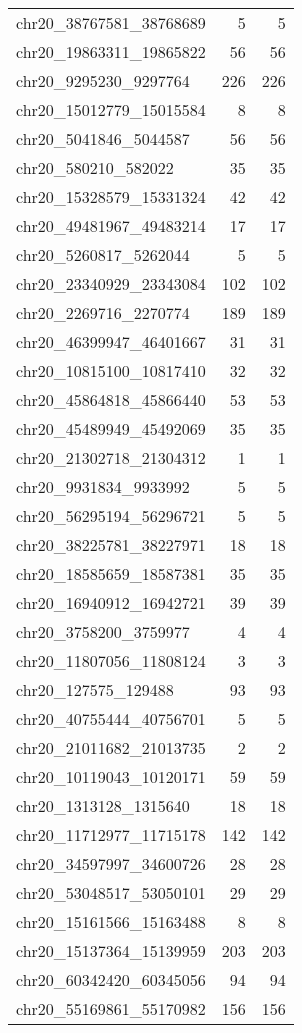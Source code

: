 \begin{longtable}{lrr}
chr20_38767581_38768689 & 5 & 5 \\
chr20_19863311_19865822 & 56 & 56 \\
chr20_9295230_9297764 & 226 & 226 \\
chr20_15012779_15015584 & 8 & 8 \\
chr20_5041846_5044587 & 56 & 56 \\
chr20_580210_582022 & 35 & 35 \\
chr20_15328579_15331324 & 42 & 42 \\
chr20_49481967_49483214 & 17 & 17 \\
chr20_5260817_5262044 & 5 & 5 \\
chr20_23340929_23343084 & 102 & 102 \\
chr20_2269716_2270774 & 189 & 189 \\
chr20_46399947_46401667 & 31 & 31 \\
chr20_10815100_10817410 & 32 & 32 \\
chr20_45864818_45866440 & 53 & 53 \\
chr20_45489949_45492069 & 35 & 35 \\
chr20_21302718_21304312 & 1 & 1 \\
chr20_9931834_9933992 & 5 & 5 \\
chr20_56295194_56296721 & 5 & 5 \\
chr20_38225781_38227971 & 18 & 18 \\
chr20_18585659_18587381 & 35 & 35 \\
chr20_16940912_16942721 & 39 & 39 \\
chr20_3758200_3759977 & 4 & 4 \\
chr20_11807056_11808124 & 3 & 3 \\
chr20_127575_129488 & 93 & 93 \\
chr20_40755444_40756701 & 5 & 5 \\
chr20_21011682_21013735 & 2 & 2 \\
chr20_10119043_10120171 & 59 & 59 \\
chr20_1313128_1315640 & 18 & 18 \\
chr20_11712977_11715178 & 142 & 142 \\
chr20_34597997_34600726 & 28 & 28 \\
chr20_53048517_53050101 & 29 & 29 \\
chr20_15161566_15163488 & 8 & 8 \\
chr20_15137364_15139959 & 203 & 203 \\
chr20_60342420_60345056 & 94 & 94 \\
chr20_55169861_55170982 & 156 & 156 \\

\end{longtable}
